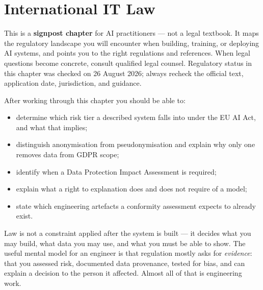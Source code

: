 
\chapter{International IT Law}


\begin{v3aside}
    This is a \textbf{signpost chapter} for AI practitioners — not a legal textbook.
    It maps the regulatory landscape you will encounter when building, training, or deploying AI systems,
    and points you to the right regulations and references.
    When legal questions become concrete, consult qualified legal counsel.
    Regulatory status in this chapter was checked on 26 August 2026; always
    recheck the official text, application date, jurisdiction, and guidance.
\end{v3aside}

\label{ch:it-law}

\begin{learningobjectives}
After working through this chapter you should be able to:
\begin{itemize}
  \item determine which risk tier a described system falls into under the EU AI
        Act, and what that implies;
  \item distinguish anonymisation from pseudonymisation and explain why only
        one removes data from GDPR scope;
  \item identify when a Data Protection Impact Assessment is required;
  \item explain what a right to explanation does and does not require of a
        model;
  \item state which engineering artefacts a conformity assessment expects to
        already exist.
\end{itemize}
\end{learningobjectives}

\begin{plainlanguage}
Law is not a constraint applied after the system is built --- it decides what
you may build, what data you may use, and what you must be able to show. The
useful mental model for an engineer is that regulation mostly asks for
\emph{evidence}: that you assessed risk, documented data provenance, tested for
bias, and can explain a decision to the person it affected. Almost all of that
is engineering work.
\end{plainlanguage}

